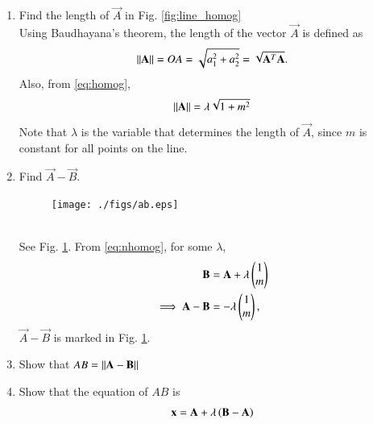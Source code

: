\documentclass[journal,12pt,twocolumn]{IEEEtran}
\renewcommand\thesection{\arabic{section}}
\begin{document}
\begin{enumerate}[label=\thesection.\arabic*
,ref=\thesection.\theenumi]
\item Find the length of $\vec{A}$ in Fig. \ref{fig:line_homog}
\\
\solution Using Baudhayana's theorem, the length of the vector $\vec{A}$ is defined as
\begin{equation}
 \lVert\mathbf{A}\rVert = OA = \sqrt{a_1^2 + a_2^2}
=\sqrt{\mathbf{A}^T\mathbf{A}}.
\end{equation}
%
Also, from \eqref{eq:homog}, 
\begin{equation}
\lVert\mathbf{A}\rVert = \lambda \sqrt{1+m^2}
\end{equation}
%
Note that $\lambda$ is the variable that determines the length of $\vec{A}$, 
since $m$ is constant for all points on the line.
%
\item Find $\vec{A}-\vec{B}$.
\begin{figure}
\centering
\texttt{[image: ./figs/ab.eps]}
\caption{}
\label{fig:ab}
\end{figure}
%
\\
\solution See Fig. \ref{fig:ab}. From \eqref{eq:nhomog}, for some 
$\lambda$,
\begin{align}
\mathbf{B} &=\mathbf{A} + \lambda \begin{pmatrix}1 \\ m\end{pmatrix}
\\
\implies \mathbf{A} - \mathbf{B} &= - \lambda \begin{pmatrix}1 \\ m\end{pmatrix},
\end{align}
%
$\vec{A} - \vec{B}$ is marked in Fig. \ref{fig:ab}.
%
\item Show that $AB = \lVert\mathbf{A}-\mathbf{B}\rVert$
\item Show that the equation of $AB$ is
\begin{align}
\label{eq:line_ab}
\mathbf{x} = \mathbf{A}+ \lambda\left(\mathbf{B}-\mathbf{A}\right)
\end{align}

\end{enumerate}
%
\end{document}
